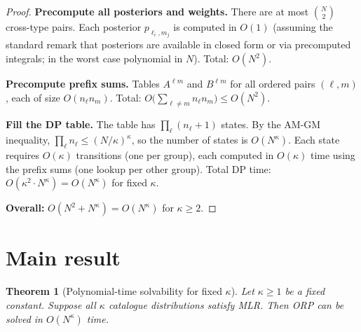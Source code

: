 \documentclass[11pt]{article}
\newtheorem{theorem}{Theorem}
\begin{document}
\begin{proof}
\textbf{Precompute all posteriors and weights.}  There are at most $\binom{N}{2}$
cross-type pairs.  Each posterior $p_{\ell_i, m_j}$ is computed in $O(1)$ (assuming
the standard remark that posteriors are available in closed form or via precomputed
integrals; in the worst case polynomial in $N$).  Total: $O(N^2)$.

\textbf{Precompute prefix sums.}  Tables $A^{\ell m}$ and $B^{\ell m}$ for all
ordered pairs $(\ell, m)$, each of size $O(n_\ell n_m)$.  Total:
$O\!\bigl(\sum_{\ell \ne m} n_\ell n_m\bigr) \le O(N^2)$.

\textbf{Fill the DP table.}  The table has $\prod_\ell (n_\ell + 1)$ states.  By the
AM-GM inequality, $\prod_\ell n_\ell \le (N/\kappa)^\kappa$, so the number of states
is $O(N^\kappa)$.  Each state requires $O(\kappa)$ transitions (one per group), each
computed in $O(\kappa)$ time using the prefix sums (one lookup per other group).
Total DP time: $O(\kappa^2 \cdot N^\kappa) = O(N^\kappa)$ for fixed $\kappa$.

\textbf{Overall:} $O(N^2 + N^\kappa) = O(N^\kappa)$ for $\kappa \ge 2$.
\end{proof}

\section{Main result}

\begin{theorem}[Polynomial-time solvability for fixed $\kappa$]\label{thm:main}
Let $\kappa \ge 1$ be a fixed constant.  Suppose all $\kappa$ catalogue distributions
satisfy MLR\@.  Then ORP can be solved in $O(N^\kappa)$ time.
\end{theorem}
\end{document}
